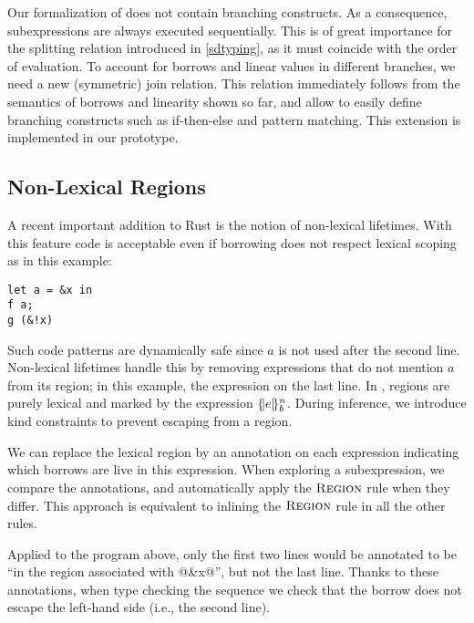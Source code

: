Our formalization of \lang does not contain branching constructs. As a consequence,
subexpressions are always executed sequentially. This is of great importance
for the splitting relation introduced in \cref{sdtyping}, as it must
coincide with the order of evaluation. To account for borrows and linear
values in different branches, we need a new (symmetric) join relation.
This relation immediately follows from the semantics of borrows and linearity
shown so far, and allow to easily define branching constructs such as if-then-else
and pattern matching.
This extension is implemented in our prototype.

\subsection{Non-Lexical Regions}

A recent important addition to Rust is the notion of non-lexical lifetimes.
With this feature code is acceptable even if borrowing does not respect
lexical scoping as in this example:

\begin{lstlisting}
let a = &x in
f a;
g (&!x)
\end{lstlisting}

Such code patterns are dynamically safe since $a$ is not used after
the second line.
Non-lexical lifetimes handle this by removing expressions
that do not mention $a$ from its region; in this example,  the
expression on the last line.
%
In \lang, regions are purely lexical and marked by the
expression $\region{b}{e}$.
During inference, we introduce kind constraints to prevent escaping from
a region.

We can replace the lexical region by
an annotation on each expression indicating which borrows are live
in this expression.
When exploring a subexpression, we compare the annotations, and automatically
apply the $\textsc{Region}$ rule when they differ.
%
This approach is equivalent to inlining the $\textsc{Region}$ rule in all the other
rules.

Applied to the program above, only the first two lines would be annotated
to be ``in the region associated with @&x@'', but not the last line.
Thanks to these annotations, when type checking the sequence we check
that the borrow does not escape the left-hand side (i.e., the second line).

\lstDeleteShortInline@

